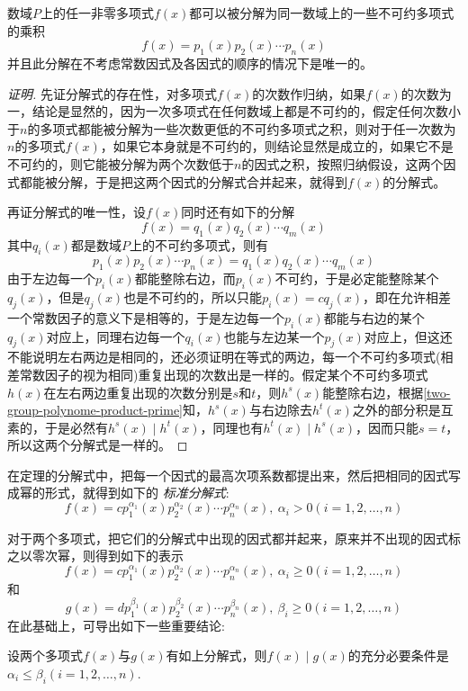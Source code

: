 \begin{theorem}[多项式因式分解定理]
  数域$P$上的任一非零多项式$f(x)$都可以被分解为同一数域上的一些不可约多项式的乘积
  \[ f(x) = p_1(x)p_2(x) \cdots p_n(x) \]
  并且此分解在不考虑常数因式及各因式的顺序的情况下是唯一的。
\end{theorem}

\begin{proof}[证明]
  先证分解式的存在性，对多项式$f(x)$的次数作归纳，如果$f(x)$的次数为一，结论是显然的，因为一次多项式在任何数域上都是不可约的，假定任何次数小于$n$的多项式都能被分解为一些次数更低的不可约多项式之积，则对于任一次数为$n$的多项式$f(x)$，如果它本身就是不可约的，则结论显然是成立的，如果它不是不可约的，则它能被分解为两个次数低于$n$的因式之积，按照归纳假设，这两个因式都能被分解，于是把这两个因式的分解式合并起来，就得到$f(x)$的分解式。

  再证分解式的唯一性，设$f(x)$同时还有如下的分解
  \[ f(x) = q_1(x)q_2(x) \cdots q_m(x) \]
  其中$q_i(x)$都是数域$P$上的不可约多项式，则有
  \[ p_1(x)p_2(x) \cdots p_n(x) = q_1(x)q_2(x) \cdots q_m(x) \]
  由于左边每一个$p_i(x)$都能整除右边，而$p_i(x)$不可约，于是必定能整除某个$q_j(x)$，但是$q_j(x)$也是不可约的，所以只能$p_i(x) = c q_j(x)$，即在允许相差一个常数因子的意义下是相等的，于是左边每一个$p_i(x)$都能与右边的某个$q_j(x)$对应上，同理右边每一个$q_i(x)$也能与左边某一个$p_j(x)$对应上，但这还不能说明左右两边是相同的，还必须证明在等式的两边，每一个不可约多项式(相差常数因子的视为相同)重复出现的次数出是一样的。假定某个不可约多项式$h(x)$在左右两边重复出现的次数分别是$s$和$t$，则$h^s(x)$能整除右边，根据\autoref{two-group-polynome-product-prime}知，$h^s(x)$与右边除去$h^t(x)$之外的部分积是互素的，于是必然有$h^s(x) \mid h^t(x)$，同理也有$h^t(x) \mid h^s(x)$，因而只能$s=t$，所以这两个分解式是一样的。
\end{proof}

在定理的分解式中，把每一个因式的最高次项系数都提出来，然后把相同的因式写成幂的形式，就得到如下的 \emph{标准分解式}:
\[ f(x)=c p_1^{\alpha_1}(x)p_2^{\alpha_2}(x) \cdots p_n^{\alpha_n}(x), \  \alpha_i>0 (i=1,2,\ldots,n) \]

对于两个多项式，把它们的分解式中出现的因式都并起来，原来并不出现的因式标之以零次幂，则得到如下的表示
\[ f(x)=c p_1^{\alpha_1}(x)p_2^{\alpha_2}(x) \cdots p_n^{\alpha_n}(x), \  \alpha_i \geqslant 0 (i=1,2,\ldots,n) \]
和
\[ g(x)=d p_1^{\beta_1}(x)p_2^{\beta_2}(x) \cdots p_n^{\beta_n}(x), \  \beta_i \geqslant 0 (i=1,2,\ldots,n) \]
在此基础上，可导出如下一些重要结论:

\begin{theorem}
  设两个多项式$f(x)$与$g(x)$有如上分解式，则$f(x) \mid g(x)$的充分必要条件是$\alpha_i \leqslant \beta_i(i=1,2,\ldots,n)$.
\end{theorem}

